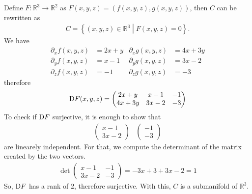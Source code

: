 \begin{solution}
    Define \(F: \mathbb{R}^3 \rightarrow \mathbb{R}^2\) as \(F(x, y, z) = (f(x, y, z), g(x, y, z))\), then \(C\) can be rewritten as
    \begin{align}
        C = \left\{ (x, y, z) \in \mathbb{R}^3 \middle| F(x, y, z) = 0 \right\} \text{.}
    \end{align}
    We have
    \begin{align}
        \partial_x f(x, y, z) &= 2x + y & \partial_x g(x, y, z) &= 4x + 3y \\
        \partial_y f(x, y, z) &= x - 1 & \partial_y g(x, y, z) &= 3x - 2 \\
        \partial_z f(x, y, z) &= -1 & \partial_z g(x, y, z) &= -3
    \end{align}
    therefore
    \begin{align}
        \mathop{}\!\mathrm{D} F (x, y, z) =
        \begin{pmatrix}
            2x + y & x - 1 & - 1 \\
            4x + 3y & 3x - 2 & -3 
        \end{pmatrix}
    \end{align}
    To check if \(\mathop{}\!\mathrm{D} F\) surjective, it is enough to show that
    \begin{align}
        \begin{pmatrix}
            x - 1 \\
            3x - 2
        \end{pmatrix} &
        \begin{pmatrix}
            -1 \\
            -3
        \end{pmatrix}
    \end{align}
    are linearely independent. For that, we compute the determinant of the matrix created by the two vectors.
    \begin{align}
        \det
        \begin{pmatrix}
            x  - 1 & -1 \\
            3x - 2 & -3
        \end{pmatrix}
        = -3x + 3 + 3x - 2 = 1
    \end{align}
    So, \(\mathop{}\!\mathrm{D} F\) has a rank of \(2\), therefore surjective. With this, \(C\) is a submanifold of \(\mathbb{R}^3\).
\end{solution}